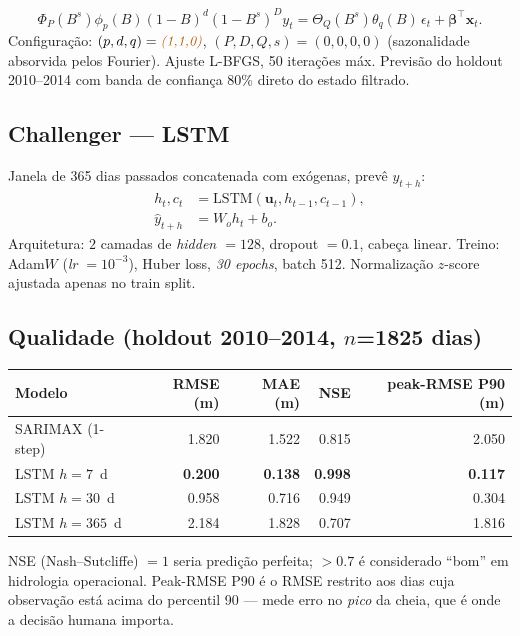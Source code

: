 \documentclass[10pt,a4paper]{article}
\newcommand{\tune}[1]{\textcolor{orange!70!black}{\textit{#1}}}
\begin{document}
\begin{equation}
  \Phi_P(B^s)\phi_p(B)(1-B)^d(1-B^s)^D y_t
  = \Theta_Q(B^s)\theta_q(B)\,\epsilon_t + \boldsymbol{\beta}^\top \mathbf{x}_t.
\end{equation}
Configuração: $(p,d,q)=\tune{(1,1,0)}$, $(P,D,Q,s)=(0,0,0,0)$ (sazonalidade
absorvida pelos Fourier). Ajuste L-BFGS, 50 iterações máx. Previsão do
holdout 2010--2014 com banda de confiança 80\% direto do estado filtrado.

\subsection*{Challenger — LSTM}

Janela de 365 dias passados concatenada com exógenas, prevê $y_{t+h}$:
\begin{align}
  h_t, c_t &= \text{LSTM}(\mathbf{u}_t, h_{t-1}, c_{t-1}), \\
  \hat{y}_{t+h} &= W_o h_t + b_o.
\end{align}
Arquitetura: $2$ camadas de \tune{hidden $=128$}, dropout $=0{.}1$, cabeça
linear. Treino: Adam$W$ (\tune{lr $=10^{-3}$}), Huber loss, \tune{30 epochs},
batch 512. Normalização $z$-score ajustada apenas no train split.

\subsection*{Qualidade (holdout 2010–2014, $n$=1825 dias)}

\begin{center}
\small
\begin{tabular}{lrrrr}
\toprule
Modelo & RMSE (m) & MAE (m) & NSE & peak-RMSE P90 (m) \\
\midrule
SARIMAX (1-step) & 1.820 & 1.522 & 0.815 & 2.050 \\
LSTM $h=7$~d & \textbf{0.200} & \textbf{0.138} & \textbf{0.998} & \textbf{0.117} \\
LSTM $h=30$~d & 0.958 & 0.716 & 0.949 & 0.304 \\
LSTM $h=365$~d & 2.184 & 1.828 & 0.707 & 1.816 \\
\bottomrule
\end{tabular}
\end{center}

NSE (Nash–Sutcliffe) $=1$ seria predição perfeita; $>0{.}7$ é considerado
``bom'' em hidrologia operacional. Peak-RMSE P90 é o RMSE restrito aos dias
cuja observação está acima do percentil 90 — mede erro no \textit{pico} da cheia,
que é onde a decisão humana importa.
\end{document}
